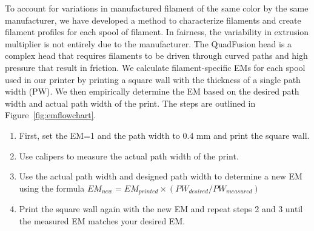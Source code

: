 To account for variations in manufactured filament of the same color by the same manufacturer, we have developed a method to characterize filaments and create filament profiles for each spool of filament. In fairness, the variability in extrusion multiplier is not entirely due to the manufacturer. The QuadFusion head is a complex head that requires filaments to be driven through curved paths and high pressure that result in friction. We calculate filament-specific EMs for each spool used in our printer by printing a square wall with the thickness of a single path width (PW). We then empirically determine the EM based on the desired path width and actual path width of the print. The steps are outlined in Figure~\ref{fig:emflowchart}.

\begin{figure}
	\begin{center}
	\end{center}
	\caption{} 
	\label{fig:em}
\end{figure} 

\begin{enumerate}
    \item First, set the EM=1 and the path width to 0.4 mm and print the square wall.
    \item Use calipers to measure the actual path width of the print.
    \item Use the actual path width and designed path width to determine a new EM using the formula $EM_{new} = EM_{printed} \times (PW_{desired}/PW_{measured})$
    \item Print the square wall again with the new EM and repeat steps 2 and 3 until the measured EM matches your desired EM. 
\end{enumerate}

